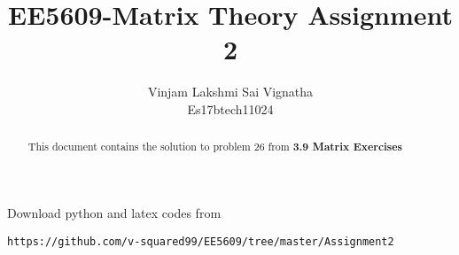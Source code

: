 \documentclass[journal,12pt,twocolumn]{IEEEtran}
\begin{document}
\newtheorem{theorem}{Theorem}[section]
\newtheorem{problem}{Problem}
\newtheorem{proposition}{Proposition}[section]
\newtheorem{lemma}{Lemma}[section]
\newtheorem{corollary}[theorem]{Corollary}
\newtheorem{example}{Example}[section]
\newtheorem{definition}[problem]{Definition}

\newcommand{\BEQA}{\begin{eqnarray}}
\newcommand{\EEQA}{\end{eqnarray}}
\newcommand{\define}{\stackrel{\triangle}{=}}

\providecommand{\mbf}{\mathbf}
\providecommand{\pr}[1]{\ensuremath{\Pr\left(#1\right)}}
\providecommand{\qfunc}[1]{\ensuremath{Q\left(#1\right)}}
\providecommand{\sbrak}[1]{\ensuremath{{}\left[#1\right]}}
\providecommand{\lsbrak}[1]{\ensuremath{{}\left[#1\right.}}
\providecommand{\rsbrak}[1]{\ensuremath{{}\left.#1\right]}}
\providecommand{\brak}[1]{\ensuremath{\left(#1\right)}}
\providecommand{\lbrak}[1]{\ensuremath{\left(#1\right.}}
\providecommand{\rbrak}[1]{\ensuremath{\left.#1\right)}}
\providecommand{\cbrak}[1]{\ensuremath{\left\{#1\right\}}}
\providecommand{\lcbrak}[1]{\ensuremath{\left\{#1\right.}}
\providecommand{\rcbrak}[1]{\ensuremath{\left.#1\right\}}}
\theoremstyle{remark}
\newtheorem{rem}{Remark}
\newcommand{\sgn}{\mathop{\mathrm{sgn}}}
\providecommand{\system}{\overset{\mathcal{H}}{ \longleftrightarrow}}
\newcommand{\solution}{\noindent \textbf{Solution: }}
\newcommand{\cosec}{\,\text{cosec}\,}
\providecommand{\dec}[2]{\ensuremath{\overset{#1}{\underset{#2}{\gtrless}}}}
\newcommand{\myvec}[1]{\ensuremath{\begin{pmatrix}#1\end{pmatrix}}}
\newcommand{\mydet}[1]{\ensuremath{\begin{vmatrix}#1\end{vmatrix}}}
\makeatletter
{}
\makeatother
\let\StandardTheFigure\thefigure
\let\vec\mathbf
\renewcommand{\thefigure}{\theproblem}
\def\putbox#1#2#3{\makebox[0in][l]{\makebox[#1][l]{}\raisebox{\baselineskip}[0in][0in]{\raisebox{#2}[0in][0in]{#3}}}}
     \def\rightbox#1{\makebox[0in][r]{#1}}
     \def\centbox#1{\makebox[0in]{#1}}
     \def\topbox#1{\raisebox{-\baselineskip}[0in][0in]{#1}}
     \def\midbox#1{\raisebox{-0.5\baselineskip}[0in][0in]{#1}}
\vspace{3cm}
\title{EE5609-Matrix Theory Assignment 2}
\author{Vinjam Lakshmi Sai Vignatha \\ Es17btech11024}
\maketitle
\newpage
\bigskip
\renewcommand{\thefigure}{\theenumi}
\renewcommand{\thetable}{\theenumi}
Download python and latex codes from 
\begin{lstlisting}
https://github.com/v-squared99/EE5609/tree/master/Assignment2
\end{lstlisting}
\begin{abstract}
This document contains the solution to problem 26 from \textbf{3.9 Matrix Exercises}
\end{abstract}
\end{document}
